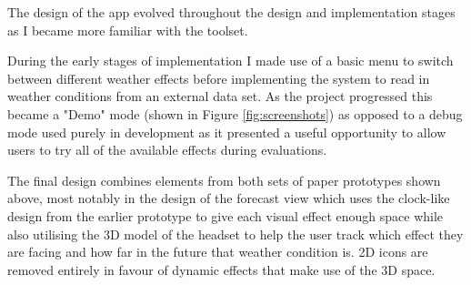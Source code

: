 \documentclass{l4proj}
\begin{document}
The design of the app evolved throughout the design and implementation stages as I became more familiar with the toolset.

During the early stages of implementation I made use of a basic menu to switch between different weather effects before implementing the system to read in weather conditions from an external data set. As the project progressed this became a "Demo" mode (shown in Figure \ref{fig:screenshots}) as opposed to a debug mode used purely in development as it presented a useful opportunity to allow users to try all of the available effects during evaluations. 

The final design combines elements from both sets of paper prototypes shown above, most notably in the design of the forecast view which uses the clock-like design from the earlier prototype to give each visual effect enough space while also utilising the 3D model of the headset to help the user track which effect they are facing and how far in the future that weather condition is. 2D icons are removed entirely in favour of dynamic effects that make use of the 3D space.
\end{document}
